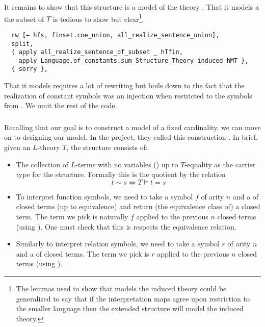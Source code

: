 It remains to show that this structure is a model of the theory .
That it models a the subset of $T$ is tedious to show but clear\footnote{
  The lemmas used to show that  models the induced
  theory could be generalized to say that if the
  interpretation maps agree upon restriction to the smaller language
  then the extended structure will model the induced theory. }.

\begin{lstlisting}
  rw [← hfs, finset.coe_union, all_realize_sentence_union],
  split,
  { apply all_realize_sentence_of_subset _ hTfin,
    apply Language.of_constants.sum_Structure_Theory_induced hMT },
  { sorry }, \end{lstlisting}

That it models  requires a lot of rewriting but
boils down to the fact that the realization of constant symbols
was an injection when restricted to the symbols from .
We omit the rest of the code.

\subsubsection{}

Recalling that our goal is to construct a model of a fixed cardinality,
we can move on to designing our model.
In the  project, they called this construction .
In brief, given an $L$-theory $T$, the structure consists of:
\begin{itemize}
  \item The collection of $L$-terms with no variables ()
        up to $T$-equality as the
        carrier type for the structure.
        Formally this is the quotient by the relation
        \[ t \sim s \iff T \vDash t = s \]
  \item To interpret function symbols, we need to take a
        symbol $f$ of arity $n$ and a  of closed terms
        (up to equivalence) and return (the equivalence class of) a closed term.
        The term we pick is naturally $f$
        applied to the previous $n$ closed terms (using ).
        One must check that this is respects the equivalence relation.
  \item Similarly to interpret relation symbols, we need to take a
        symbol $r$ of arity $n$ and a  of closed terms.
        The term we pick is $r$ applied to the previous $n$ closed terms
        (using ).
\end{itemize}

